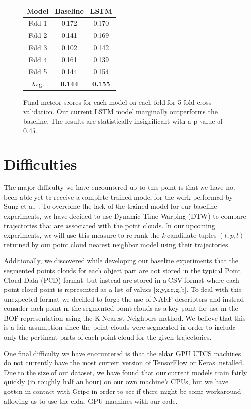 \documentclass[letterpaper, 12 pt, conference]{ieeeconf}
\begin{document}
\begin{figure}[h]
\centering
\begin{tabular}{|c | c | c |}
\hline
\textbf{Model} & \textbf{Baseline} & \textbf{LSTM} \\
\hline
Fold 1 & 0.172 & 0.170\\
\hline
Fold 2 & 0.141 & 0.169 \\
\hline
Fold 3 & 0.102 & 0.142 \\
\hline
Fold 4 & 0.161 & 0.139 \\
\hline
Fold 5 & 0.144 & 0.154 \\
\hline
Avg. & \textbf{0.144} & \textbf{0.155} \\
\hline
\end{tabular}
\caption{Final meteor scores for each model on each fold for 5-fold cross validation. Our current LSTM model marginally outperforms the baseline. The results are statistically insignificant with a p-value of 0.45.}
\label{fig:score_table}
\end{figure}

\section{Difficulties}\label{Difficulties}

The major difficulty we have encountered up to this point is that we have not been able yet to receive a complete trained model for the work performed by Sung et al. \cite{sung2016robobarista}. To overcome the lack of the trained model for our baseline experiments, we have decided to use Dynamic Time Warping (DTW) to compare trajectories that are associated with the point clouds. In our upcoming experiments, we will use this measure to re-rank the $k$ candidate tuples $(t,p,l)$ returned by our point cloud nearest neighbor model using their trajectories.   

Additionally, we discovered while developing our baseline experiments that the segmented points clouds for each object part are not stored in the typical Point Cloud Data (PCD) format, but instead are stored in a CSV format where each point cloud point is represented as a list of values [x,y,z,r,g,b]. To deal with this unexpected format we decided to forgo the use of NARF \cite{steder2010narf} descriptors and instead consider each point in the segmented point clouds as a key point for use in the BOF representation using the K-Nearest Neighbors method. We believe that this is a fair assumption since the point clouds were segmented in order to include only the pertinent parts of each point cloud for the given trajectories. 
\par
One final difficulty we have encountered is that the eldar GPU UTCS machines do not currently have the most current version of TensorFlow or Keras installed. Due to the size of our dataset, we have found that our current models train fairly quickly (in roughly half an hour) on our own machine's CPUs, but we have gotten in contact with Gripe in order to see if there might be some workaround allowing us to use the eldar GPU machines with our code. 
\end{document}
